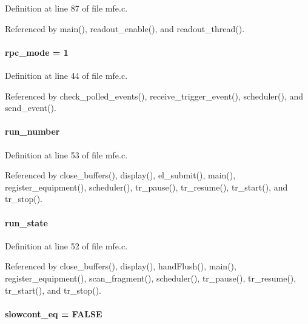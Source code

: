 Definition at line 87 of file mfe.c.

Referenced by main(), readout\_\-enable(), and readout\_\-thread().
\paragraph[{rpc\_\-mode}]{ {\bf rpc\_\-mode} = 1}\hfill\label{mfe_8c_a1de1daba819451b18ef6974bb6a33a34}


Definition at line 44 of file mfe.c.

Referenced by check\_\-polled\_\-events(), receive\_\-trigger\_\-event(), scheduler(), and send\_\-event().
\paragraph[{run\_\-number}]{ {\bf run\_\-number}}\hfill\label{mfe_8c_a16695ea2bfd19f294afe066d6007ab36}


Definition at line 53 of file mfe.c.

Referenced by close\_\-buffers(), display(), el\_\-submit(), main(), register\_\-equipment(), scheduler(), tr\_\-pause(), tr\_\-resume(), tr\_\-start(), and tr\_\-stop().
\paragraph[{run\_\-state}]{ {\bf run\_\-state}}\hfill\label{mfe_8c_a81f01ccafac403262a2e430c118516a3}


Definition at line 52 of file mfe.c.

Referenced by close\_\-buffers(), display(), handFlush(), main(), register\_\-equipment(), scan\_\-fragment(), scheduler(), tr\_\-pause(), tr\_\-resume(), tr\_\-start(), and tr\_\-stop().
\paragraph[{slowcont\_\-eq}]{ {\bf slowcont\_\-eq} = FALSE}\hfill\label{mfe_8c_a4ab4f1288fd294c7c649291f87355985}


